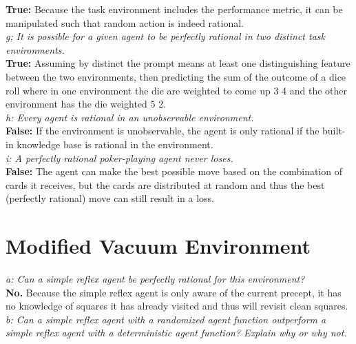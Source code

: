 \documentclass[journal]{IEEEtran}
\begin{document}
\noindent \textbf{True:} Because the task environment includes the 
performance metric, it can be manipulated such that random action is indeed rational. \\

\noindent \textit{g; It is possible for a given agent to be perfectly 
rational in two distinct task environments.} \\

\noindent \textbf{True:} Assuming by distinct the prompt means at 
least one distinguishing feature between the two environments, then 
predicting the sum of the outcome of a dice roll where in one environment 
the die are weighted to come up 3 4 and the other environment has the 
die weighted 5 2. \\

\noindent \textit{h: Every agent is rational in an unobservable environment.} \\

\noindent \textbf{False:} If the environment is unobservable, the 
agent is only rational if the built-in knowledge base is rational in 
the environment. \\

\noindent \textit{i: A perfectly rational poker-playing agent never loses.} \\

\noindent \textbf{False:} The agent can make the best possible move based 
on the combination of cards it receives, but the cards are distributed at 
random and thus the best (perfectly rational) move can still result in a loss. \\


\section{Modified Vacuum Environment}

\noindent \textit{a: Can a simple reflex agent be perfectly rational for 
this environment?} \\

\noindent \textbf{No.} Because the simple reflex agent is only aware of 
the current precept, it has no knowledge of squares it has already visited 
and thus will revisit clean squares. \\

\noindent \textit{b: Can a simple reflex agent with a randomized agent 
function outperform a simple reflex agent with a deterministic agent 
function? Explain why or why not.} \\
\end{document}
